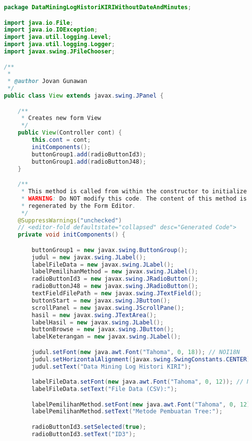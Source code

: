\begin{lstlisting}[language=Java,basicstyle=\tiny,caption=View.java]
package DataMiningLogHistoriKIRIWithoutDateAndMinutes;

import java.io.File;
import java.io.IOException;
import java.util.logging.Level;
import java.util.logging.Logger;
import javax.swing.JFileChooser;

/**
 *
 * @author Jovan Gunawan
 */
public class View extends javax.swing.JPanel {

    /**
     * Creates new form View
     */
    public View(Controller cont) {
        this.cont = cont;
        initComponents();
        buttonGroup1.add(radioButtonId3);
        buttonGroup1.add(radioButtonJ48);
    }

    /**
     * This method is called from within the constructor to initialize the form.
     * WARNING: Do NOT modify this code. The content of this method is always
     * regenerated by the Form Editor.
     */
    @SuppressWarnings("unchecked")
    // <editor-fold defaultstate="collapsed" desc="Generated Code">                          
    private void initComponents() {

        buttonGroup1 = new javax.swing.ButtonGroup();
        judul = new javax.swing.JLabel();
        labelFileData = new javax.swing.JLabel();
        labelPemilihanMethod = new javax.swing.JLabel();
        radioButtonId3 = new javax.swing.JRadioButton();
        radioButtonJ48 = new javax.swing.JRadioButton();
        textFieldFilePath = new javax.swing.JTextField();
        buttonStart = new javax.swing.JButton();
        scrollPanel = new javax.swing.JScrollPane();
        hasil = new javax.swing.JTextArea();
        labelHasil = new javax.swing.JLabel();
        buttonBrowse = new javax.swing.JButton();
        labelKeterangan = new javax.swing.JLabel();

        judul.setFont(new java.awt.Font("Tahoma", 0, 18)); // NOI18N
        judul.setHorizontalAlignment(javax.swing.SwingConstants.CENTER);
        judul.setText("Data Mining Log Histori KIRI");

        labelFileData.setFont(new java.awt.Font("Tahoma", 0, 12)); // NOI18N
        labelFileData.setText("File Data (CSV):");

        labelPemilihanMethod.setFont(new java.awt.Font("Tahoma", 0, 12)); // NOI18N
        labelPemilihanMethod.setText("Metode Pembuatan Tree:");

        radioButtonId3.setSelected(true);
        radioButtonId3.setText("ID3");


\end{lstlisting}
